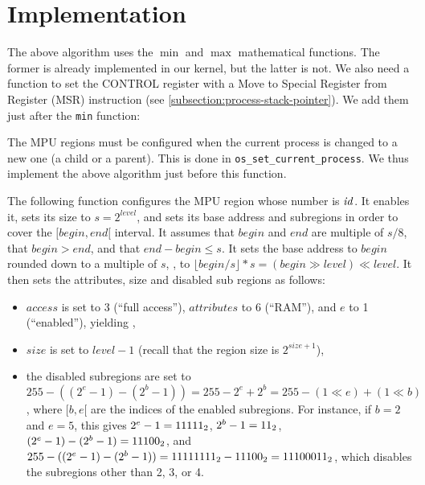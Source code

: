 \section{Implementation}


The above algorithm uses the $\min$ and $\max$ mathematical functions. The
former is already implemented in our kernel, but the latter is not. We also
need a function to set the CONTROL register with a Move to Special Register
from Register (MSR) instruction (see \cref{subsection:process-stack-pointer}).
We add them just after the {\tt min} function:



The MPU regions must be configured when the current process is changed to a new
one (a child or a parent). This is done in {\tt os\_set\_current\_process}. We
thus implement the above algorithm just before this function.

The following function configures the MPU region whose number is $\it{id}$. It
enables it, sets its size to $s=2^{\mathit{level}}$, and sets its base address
and subregions in order to cover the $[\mathit{begin},\mathit{end}[$ interval.
It assumes that $\mathit{begin}$ and $\mathit{end}$ are multiple of $s/8$, that
$\mathit{begin} > \mathit{end}$, and that $\mathit{end}-\mathit{begin} \le s$.
It sets the base address to $\mathit{begin}$ rounded down to a multiple of $s$,
\ie, to $\lfloor \mathit{begin}/s \rfloor * s = (\mathit{begin} \gg
\mathit{level}) \ll \mathit{level}$. It then sets the attributes, size and
disabled sub regions as follows:
\begin{itemize}
  \item $\mathit{access}$ is set to 3 (``full access''), $\mathit{attributes}$
  to 6 (``RAM''), and $e$ to 1 (``enabled''), yielding
  ,

  \item $\mathit{size}$ is set to $\mathit{level}-1$ (recall that the region
  size is $2^{\mathit{size}+1}$),

  \item the disabled subregions are set to $255 - ((2^e-1) - (2^b-1)) = 255 -
  2^e + 2^b = 255 - (1 \ll e) + (1 \ll b)$, where $[b,e[$ are
  the indices of the enabled subregions. For instance, if $b=2$ and $e=5$, this
  gives $2^e-1=11111_2$, $2^b-1=11_2$, $(2^e-1) - (2^b-1) =
  11100_2$, and $255 - ((2^e-1) - (2^b-1)) = 11111111_2 -
  11100_2 = 11100011_2$, which disables the subregions other than 2,
  3, or 4.
\end{itemize}

